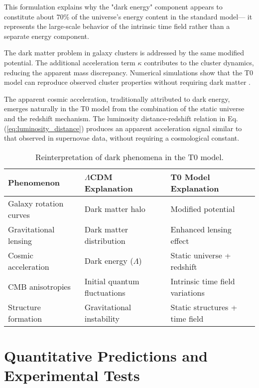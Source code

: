 \documentclass[12pt,a4paper]{article} %
\begin{document}
	This formulation explains why the "dark energy" component
	appears to constitute about 70\% of the universe's energy content
	in the standard model—
	it represents the large-scale behavior of the intrinsic time field
	rather than a separate energy component.
	
	The dark matter problem in galaxy clusters
	is addressed by the same modified potential. 
	The additional acceleration term $\kappa$
	contributes to the cluster dynamics,
	reducing the apparent mass discrepancy. 
	Numerical simulations show that the T0 model
	can reproduce observed cluster properties
	without requiring dark matter \cite{Pascher2025b}.
	
	The apparent cosmic acceleration,
	traditionally attributed to dark energy,
	emerges naturally in the T0 model
	from the combination of the static universe and the redshift mechanism. 
	The luminosity distance-redshift relation
	in Eq. (\ref{eq:luminosity_distance})
	produces an apparent acceleration signal
	similar to that observed in supernovae data,
	without requiring a cosmological constant.
	
	\begin{table}[ht]
		\centering
		\caption{Reinterpretation of dark phenomena in the T0 model.}
		\label{tab:dark_reinterpretation}
		\begin{tabular}{lll} %
			\hline
			\textbf{Phenomenon} & \textbf{$\Lambda$CDM Explanation} & \textbf{T0 Model Explanation} \\
			\hline
			Galaxy rotation curves & Dark matter halo & Modified potential \\
			Gravitational lensing & Dark matter distribution & Enhanced lensing effect \\
			Cosmic acceleration & Dark energy ($\Lambda$) & Static universe + redshift \\
			CMB anisotropies & Initial quantum fluctuations & Intrinsic time field variations \\
			Structure formation & Gravitational instability & Static structures + time field \\
			\hline
		\end{tabular}
	\end{table}
	
	\section{Quantitative Predictions and Experimental Tests}
	\label{sec:predictions}
	
\end{document}
